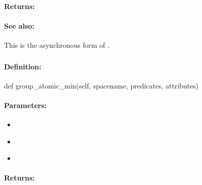 \paragraph{Returns:}


\paragraph{See also:}  This is the asynchronous form of .

\pagebreak
\subsubsection{}
\label{api:python:group_atomic_min}


\paragraph{Definition:}
\begin{pythoncode}
def group_atomic_min(self, spacename, predicates, attributes)
\end{pythoncode}

\paragraph{Parameters:}
\begin{itemize}[noitemsep]
\item {}\\

\item {}\\

\item {}\\

\end{itemize}

\paragraph{Returns:}


\pagebreak
\subsubsection{}
\label{api:python:async_group_atomic_min}


